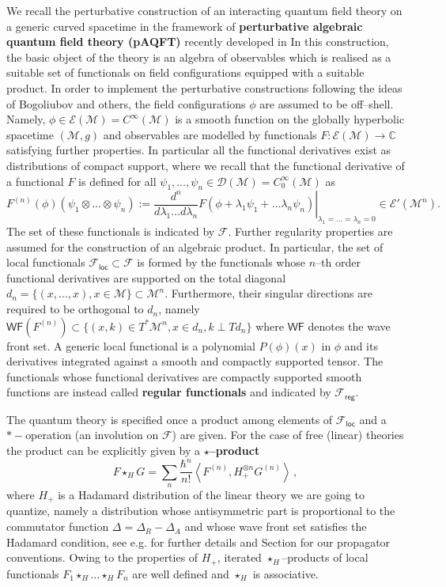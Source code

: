 \documentclass[10pt]{book}
\newcommand{\WF}{\mathsf{WF}}
\newcommand{\loc}{\mathsf{loc}}
\newcommand{\reg}{\mathsf{reg}}
\newcommand{\Dcal}{\mathcal{D}}
\newcommand{\Mcal}{\mathcal{M}}
\theoremstyle{break}
\begin{document}
We recall the perturbative construction of an interacting quantum field theory on a generic curved spacetime in  the framework of {\bf perturbative algebraic quantum field theory (pAQFT)} recently developed in  %
In this construction, the basic object of the theory is an algebra of observables which is realised as a suitable set of functionals on field configurations equipped with a suitable product.
In order to implement the perturbative constructions following the ideas of Bogoliubov and others, the field configurations $\phi$ are assumed to be off--shell. Namely, $\phi\in\mathcal{E}(\Mcal)=C^\infty(\Mcal)$ is a smooth function on the globally hyperbolic spacetime $(\Mcal,g)$ and observables are modelled by functionals $F:\mathcal{E}(\Mcal)\to \mathbb{C}$ satisfying further properties. In particular all the functional derivatives exist as distributions of compact support, where we recall that the functional derivative of a functional $F$ is defined for all $\psi_1,\ldots,\psi_n\in \Dcal(\Mcal)=C_0^\infty(\Mcal)$ as
\[ 
F^{(n)}(\phi)(\psi_1\otimes \dots \otimes \psi_n) :=  \left.\frac{d^n}{d\lambda_1    \dots d\lambda_n } F(\phi + \lambda_1 \psi_1 +\dots \lambda_n \psi_n)\right|_{\lambda_1 = \dots=\lambda_n=0} \in \mathcal{E}'(\Mcal^n).
\]
The set of these functionals is indicated by $\mathcal{F}$. 
Further regularity properties are assumed for the construction of an algebraic product.  In particular, the set of local functionals $\mathcal{F}_\loc\subset \mathcal{F}$ is formed by the functionals whose $n$--th order functional derivatives are supported on the total diagonal $d_n = \{(x,\dots, x) , x\in \Mcal\}\subset \Mcal^n $. Furthermore, their singular directions are required to be orthogonal to $d_n$, namely $\WF(F^{(n)})\subset \{ (x,k) \in T^*\Mcal^n, x\in d_n, k \perp  T d_n \}$ where $\WF$ denotes the wave front set. A generic local functional is a polynomial $P(\phi)(x)$ in $\phi$ and its derivatives integrated against a smooth and compactly supported tensor. The functionals whose functional derivatives are compactly supported smooth functions are instead called {\bf regular functionals} and indicated by $\mathcal{F}_\reg$.

The quantum theory is specified once a product among elements of $\mathcal{F}_\loc$ and a $*-$operation (an involution on $\mathcal{F}$) are given. For the case of free (linear) theories the product can be explicitly given by a {\bf $\star$--product }
\begin{equation}
F \star_H  G =  \sum_n \frac{\hbar^n}{n!}\left\langle F^{(n)}, H_+^{\otimes n} G^{(n)} \right\rangle\,,
\end{equation}
where $H_+$ is a Hadamard distribution of the linear theory we are going to quantize, namely a distribution whose antisymmetric part is proportional to the commutator function $\Delta=\Delta_R-\Delta_A$ and whose wave front set satisfies the Hadamard condition, see e.g. %
for further details and Section %
for our propagator conventions. Owing to the properties of $H_+$, iterated $\star_H$--products of local functionals $F_1 \star_H \dots \star_H F_n$ are well defined and $\star_H$ is associative.
\end{document}

